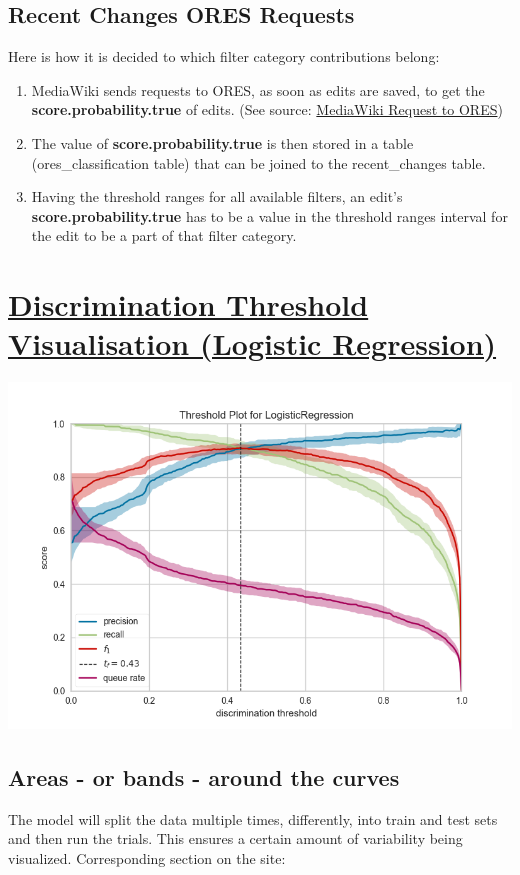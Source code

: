 \documentclass[12pt,a4paper]{article}
\begin{document}
{\subsection{Recent Changes ORES Requests}
Here is how it is decided to which filter category contributions belong:
\begin{enumerate}
\item MediaWiki sends requests to ORES, as soon as edits are saved, to get the \textbf{score.probability.true} of edits. (See source: \href{https://github.com/wikimedia/mediawiki-extensions-ORES/blob/master/includes/FetchScoreJob.php}{MediaWiki Request to ORES})
\item The value of \textbf{score.probability.true} is then stored in a table (ores\_classification table) that can be joined to the recent\_changes table.
\item Having the threshold ranges for all available filters, an edit's \textbf{score.probability.true} has to be a value in the threshold ranges interval for the edit to be a part of that filter category.
\end{enumerate}
%
%
%
\section{\href{http://www.scikit-yb.org/en/latest/api/classifier/threshold.html}{Discrimination Threshold Visualisation (Logistic Regression)}}
\includegraphics[scale=0.7]{resources/4/discriminationThresholdVisualization}\\
\subsection{Areas - or bands - around the curves}
The model will split the data multiple times, differently, into train and test sets and then run the trials. This ensures a certain amount of variability being visualized. Corresponding section on the site: \\

}
\end{document}
